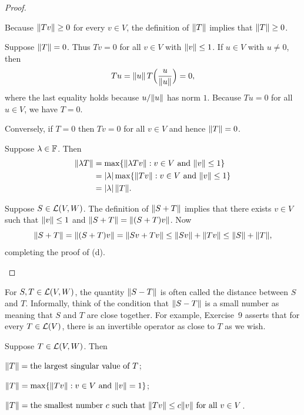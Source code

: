 \begin{proof}\leavevmode
\begin{parts}
\item Because $\lVert Tv \rVert\ge0$ for every $v\in V$, the definition of $\lVert T \rVert$
  implies that $\lVert T \rVert\ge0$.
\item Suppose $\lVert T \rVert=0$. Thus $Tv=0$ for all $v\in V$ with $\lVert v \rVert\le1$.
  If $u\in V$ with $u\ne0$, then
  \[ Tu = \lVert u \rVert\,T\Bigl(\frac{u}{\lVert u \rVert}\Bigr) = 0, \]
  where the last equality holds because $u/\lVert u \rVert$ has norm $1$. Because
  $Tu=0$ for all $u\in V$, we have $T=0$.

  Conversely, if $T=0$ then $Tv=0$ for all $v\in V$ and hence $\lVert T \rVert=0$.
\item Suppose $\lambda\in\mathbb{F}$. Then
  \begin{align*}
  \lVert \lambda T \rVert &= \max\{\lVert \lambda Tv \rVert : v\in V \text{ and } \lVert v \rVert\le1\}\\
    &= \lvert \lambda \rvert\max\{\lVert Tv \rVert : v\in V \text{ and } \lVert v \rVert\le1\}\\
    &= \lvert \lambda \rvert\,\lVert T \rVert.
  \end{align*}
\item Suppose $S\in\mathcal{L}(V,W)$. The definition of $\lVert S+T \rVert$ implies that
  there exists $v\in V$ such that $\lVert v \rVert\le1$ and
  $\lVert S+T \rVert=\lVert (S+T)v \rVert$. Now
  \[ \lVert S+T \rVert = \lVert (S+T)v \rVert = \lVert Sv+Tv \rVert \le \lVert Sv \rVert+\lVert Tv \rVert
     \le \lVert S \rVert+\lVert T \rVert, \]
  completing the proof of (d).\qedhere
\end{parts}
\end{proof}

For $S,T\in\mathcal{L}(V,W)$, the quantity $\lVert S-T \rVert$ is often called the distance
between $S$ and $T$. Informally, think of the condition that $\lVert S-T \rVert$ is a
small number as meaning that $S$ and $T$ are close together. For example,
Exercise~9 asserts that for every $T\in\mathcal{L}(V)$, there is an invertible
operator as close to $T$ as we wish.

\begin{result}\label{ax:7.88}
Suppose $T\in\mathcal{L}(V,W)$. Then
\begin{parts}
\item $\lVert T \rVert=\text{the largest singular value of }T$;
\item $\lVert T \rVert=\max\{\lVert Tv \rVert : v\in V \text{ and } \lVert v \rVert=1\}$;
\item $\lVert T \rVert=\text{the smallest number }c\text{ such that }
  \lVert Tv \rVert\le c\lVert v \rVert\text{ for all }v\in V$.
\end{parts}
\end{result}

